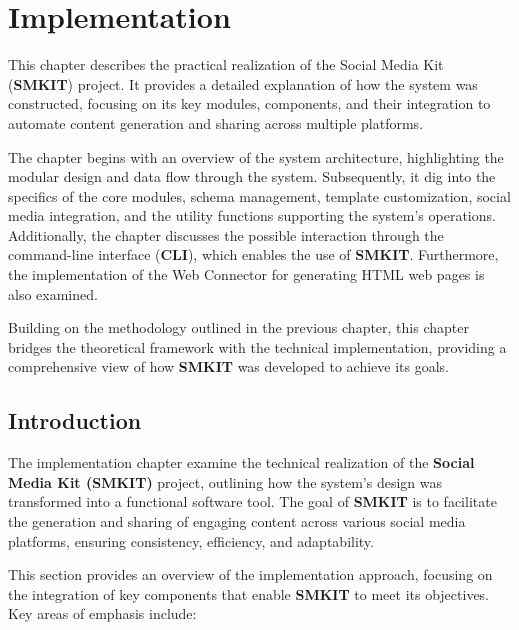 
\chapter{Implementation}
\label{chp:implementation}
This chapter describes the practical realization of the Social Media Kit (\textbf{SMKIT}) project. It provides a detailed explanation of how the system was constructed, focusing on its key modules, components, and their integration to automate content generation and sharing across multiple platforms. 

The chapter begins with an overview of the system architecture, highlighting the modular design and data flow through the system. Subsequently, it dig into the specifics of the core modules, schema management, template customization, social media integration, and the utility functions supporting the system's operations. Additionally, the chapter discusses the possible interaction through the command-line interface (\textbf{CLI}), which enables the use of \textbf{SMKIT}. Furthermore, the implementation of the Web Connector for generating HTML web pages is also examined.

Building on the methodology outlined in the previous chapter, this chapter bridges the theoretical framework with the technical implementation, providing a comprehensive view of how \textbf{SMKIT} was developed to achieve its goals.


\section{Introduction}
\label{sec:implementation_introduction}
The implementation chapter examine the technical realization of the \textbf{Social Media Kit (SMKIT)} project, outlining how the system's design was transformed into a functional software tool. The goal of \textbf{SMKIT} is to facilitate the generation and sharing of engaging content across various social media platforms, ensuring consistency, efficiency, and adaptability.

This section provides an overview of the implementation approach, focusing on the integration of key components that enable \textbf{SMKIT} to meet its objectives. Key areas of emphasis include:

